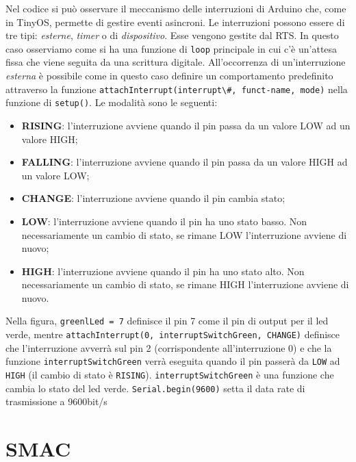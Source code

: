 Nel codice si può osservare il meccanismo delle interruzioni di Arduino che, come in TinyOS, permette di gestire eventi asincroni. Le interruzioni possono essere di tre tipi: \textit{esterne}, \textit{timer} o di \textit{dispositivo}. 
Esse vengono gestite dal RTS. In questo caso osserviamo come si ha una funzione di \lstinline{loop} principale in cui c'è un'attesa fissa che viene seguita da una scrittura digitale. All'occorrenza di un'interruzione \textit{esterna} è possibile come in questo caso definire un comportamento predefinito attraverso la funzione \lstinline{attachInterrupt(interrupt\#, funct-name, mode)} nella funzione di \lstinline{setup()}. Le modalità sono le seguenti:

\begin{itemize}
\item \textbf{RISING}: l'interruzione avviene quando il pin passa da un valore LOW ad un valore HIGH;
\item \textbf{FALLING}: l'interruzione avviene quando il pin passa da un valore HIGH ad un valore LOW;
\item \textbf{CHANGE}: l'interruzione avviene quando il pin cambia stato;
\item \textbf{LOW}: l'interruzione avviene quando il pin ha uno stato basso. Non necessariamente un cambio di stato, se rimane LOW l'interruzione avviene di nuovo;
\item \textbf{HIGH}: l'interruzione avviene quando il pin ha uno stato alto. Non necessariamente un cambio di stato, se rimane HIGH l'interruzione avviene di nuovo.
\end{itemize}

Nella figura, \lstinline{greenlLed = 7} definisce il pin 7 come il pin di output per il led verde, mentre \lstinline{attachInterrupt(0, interruptSwitchGreen, CHANGE)} definisce che l'interruzione avverrà sul pin 2 (corrispondente all'interruzione 0) e che la funzione \lstinline{interruptSwitchGreen} verrà eseguita quando il pin passerà da \lstinline{LOW} ad \lstinline{HIGH} (il cambio di stato è \lstinline{RISING}). \lstinline{interruptSwitchGreen} è una funzione che cambia lo stato del led verde.
\lstinline{Serial.begin(9600)} setta il data rate di trasmissione a 9600bit/s


\section{SMAC}


